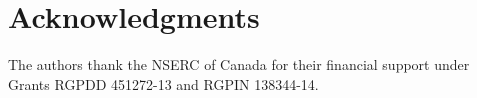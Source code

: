\section*{Acknowledgments}
The authors thank the NSERC of Canada for their financial support under Grants RGPDD 451272-13 and RGPIN 138344-14. 







   

























